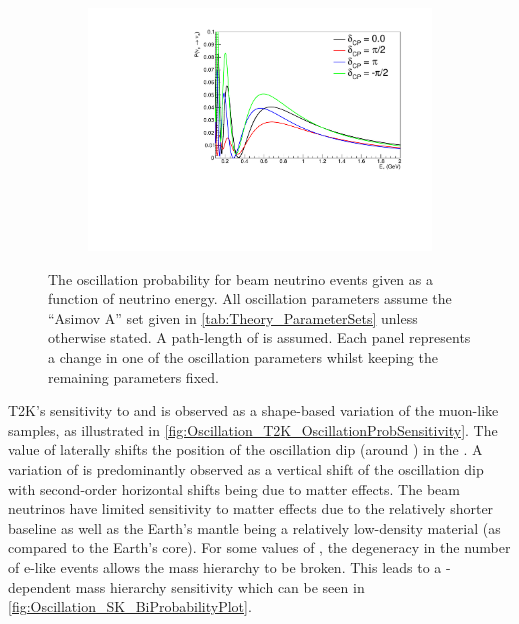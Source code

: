 \begin{figure}[h]
\begin{subfigure}[t]{0.5\textwidth}
    \includegraphics[width=\textwidth, trim={0mm 0mm 0mm 0mm}, clip,page=1]{Figures/Oscillation/T2K_NuMu_x_NuE_DCPSens.pdf}
  \end{subfigure}
  \caption{The oscillation probability for beam neutrino events given as a function of neutrino energy. All oscillation parameters assume the ``Asimov A'' set given in \autoref{tab:Theory_ParameterSets} unless otherwise stated. A path-length of  is assumed. Each panel represents a change in one of the oscillation parameters whilst keeping the remaining parameters fixed.}
  \label{fig:Oscillation_T2K_OscillationProbSensitivity}
\end{figure}

\newpage

T2K's sensitivity to  and  is observed as a shape-based variation of the muon-like samples, as illustrated in \autoref{fig:Oscillation_T2K_OscillationProbSensitivity}. The value of  laterally shifts the position of the oscillation dip (around ) in the . A variation of  is predominantly observed as a vertical shift of the oscillation dip with second-order horizontal shifts being due to matter effects. The beam neutrinos have limited sensitivity to matter effects due to the relatively shorter baseline as well as the Earth's mantle being a relatively low-density material (as compared to the Earth's core). For some values of , the degeneracy in the number of e-like events allows the mass hierarchy to be broken. This leads to a -dependent mass hierarchy sensitivity which can be seen in \autoref{fig:Oscillation_SK_BiProbabilityPlot}.

